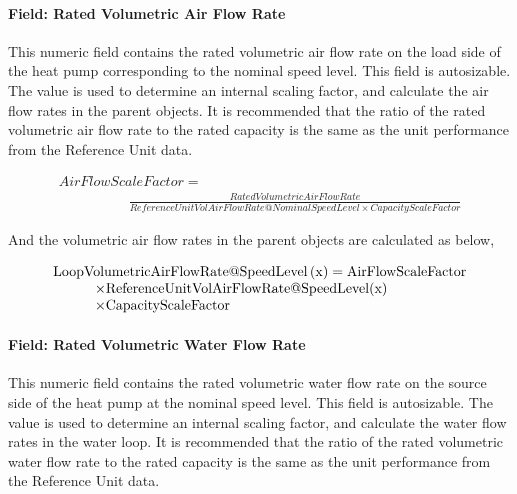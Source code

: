 \paragraph{Field: Rated Volumetric Air Flow Rate}\label{field-rated-volumetric-air-flow-rate-1}

This numeric field contains the rated volumetric air flow rate on the load side of the heat pump corresponding to the nominal speed level. This field is autosizable. The value is used to determine an internal scaling factor, and calculate the air flow rates in the parent objects. It is recommended that the ratio of the rated volumetric air flow rate to the rated capacity is the same as the unit performance from the Reference Unit data.

\begin{equation}
  \begin{array}{l}
    AirFlowScaleFactor = \\\quad \quad \quad \quad \quad \frac{{RatedVolumetricAirFlowRate}}{{ReferenceUnitVolAirFlowRate@NominalSpeedLevel \times CapacityScaleFactor}}
  \end{array}
\end{equation}

And the volumetric air flow rates in the parent objects are calculated as below,

\begin{equation}
  \begin{array}{l}
    \rm{LoopVolumetricAirFlowRate} @ \rm{SpeedLevel} \left( x \right) = \rm{AirFlowScaleFactor} \\
    \quad \quad \quad \times \rm{ReferenceUnitVolAirFlowRate} @ \rm{SpeedLevel}(x) \\
    \quad \quad \quad \times \rm{CapacityScaleFactor}
  \end{array}
\end{equation}



\paragraph{Field: Rated Volumetric Water Flow Rate}\label{field-rated-volumetric-water-flow-rate}

This numeric field contains the rated volumetric water flow rate on the source side of the heat pump at the nominal speed level. This field is autosizable. The value is used to determine an internal scaling factor, and calculate the water flow rates in the water loop. It is recommended that the ratio of the rated volumetric water flow rate to the rated capacity is the same as the unit performance from the Reference Unit data.

